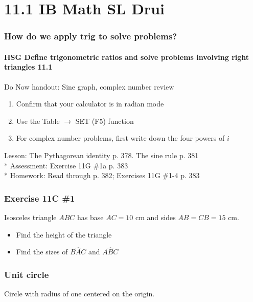 \documentclass{beamer}
\begin{document}
\section{11.1 IB Math SL Drui}
\frame
{
  \frametitle{How do we apply trig to solve problems?}
  \framesubtitle{HSG Define trigonometric ratios and solve problems involving right triangles \qquad \alert{11.1}}

\begin{block}{Do Now handout: Sine graph, complex number review}
  \begin{enumerate}
    \item Confirm that your calculator is in radian mode
    \item Use the Table $\xrightarrow{}$ SET (F5) function
    \item For complex number problems, first write down the four powers of $i$
    \end{enumerate}
  \end{block}
  Lesson: The Pythagorean identity p. 378. The sine rule p. 381\\*
  Assessment: Exercise 11G \#1a p. 383\\*
  Homework: Read through p. 382; Exercises 11G \#1-4 p. 383\\
}

\frame
{
  \frametitle{Exercise 11C \#1}
  Isosceles triangle $ABC$ has base $AC = 10 \text{ cm}$ and sides $AB=CB=15 \text{ cm}$.
\begin{itemize}
      \item Find the height of the triangle
      \item Find the sizes of $B\hat{A}C$ and $A\hat{B}C$
\end{itemize}
\begin{center}
\end{center}
 }

\frame
{
  \frametitle{Unit circle}
  Circle with radius of one centered on the origin.
\begin{center}
\end{center}
 }
\end{document}
